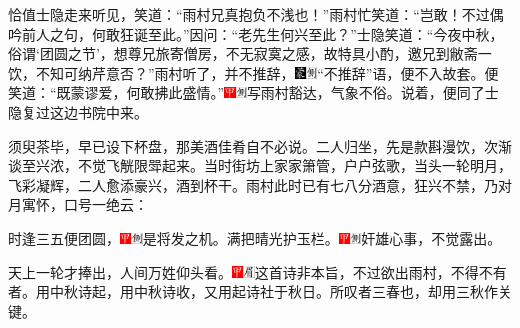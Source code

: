 恰值士隐走来听见，笑道：``雨村兄真抱负不浅也！''雨村忙笑道：``岂敢！不过偶吟前人之句，何敢狂诞至此。''因问：``老先生何兴至此？''士隐笑道：``今夜中秋，俗谓`团圆之节'，想尊兄旅寄僧房，不无寂寞之感，故特具小酌，邀兄到敝斋一饮，不知可纳芹意否？''雨村听了，并不推辞，{\includegraphics[width=3mm]{../Images/00006}\includegraphics[width=3mm]{../Images/00011}\footnotesize ``不推辞''语，便不入故套。}便笑道：``既蒙谬爱，何敢拂此盛情。''{\includegraphics[width=3mm]{../Images/00002}\includegraphics[width=3mm]{../Images/00011}\footnotesize 写雨村豁达，气象不俗。}说着，便同了士隐复过这边书院中来。

须臾茶毕，早已设下杯盘，那美酒佳肴自不必说。二人归坐，先是款斟漫饮，次渐谈至兴浓，不觉飞觥限斝起来。当时街坊上家家箫管，户户弦歌，当头一轮明月，飞彩凝辉，二人愈添豪兴，酒到杯干。雨村此时已有七八分酒意，狂兴不禁，乃对月寓怀，口号一绝云：

时逢三五便团圆，{\includegraphics[width=3mm]{../Images/00002}\includegraphics[width=3mm]{../Images/00011}\footnotesize 是将发之机。}满把晴光护玉栏。{\includegraphics[width=3mm]{../Images/00002}\includegraphics[width=3mm]{../Images/00011}\footnotesize 奸雄心事，不觉露出。}

天上一轮才捧出，人间万姓仰头看。{\includegraphics[width=3mm]{../Images/00002}\includegraphics[width=3mm]{../Images/00010}\footnotesize  这首诗非本旨，不过欲出雨村，不得不有者。用中秋诗起，用中秋诗收，又用起诗社于秋日。所叹者三春也，却用三秋作关键。}

